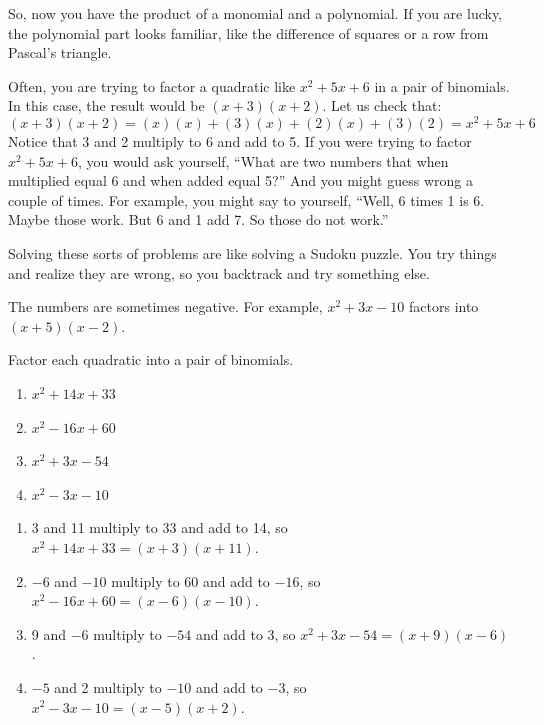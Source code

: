 So, now you have the product of a monomial and a polynomial. If you
are lucky, the polynomial part looks familiar, like the difference of
squares or a row from Pascal's triangle.

Often, you are trying to factor a quadratic like $x^2 + 5x + 6$ in a pair
of binomials. In this case, the result would be $(x + 3)(x + 2)$. Let us check that:
\begin{equation*}
  (x + 3)(x + 2) = (x)(x) + (3)(x) + (2)(x) + (3)(2) = x^2 + 5x + 6
\end{equation*}
Notice that 3 and 2 multiply to 6 and add to 5. If you were trying to
factor $x^2 + 5x + 6$, you would ask yourself, ``What are two numbers that
when multiplied equal 6 and when added equal 5?'' And you might
guess wrong a couple of times. For example, you might say to yourself,
``Well, 6 times 1 is 6. Maybe those work. But 6 and 1 add 7. So those
do not work.''

Solving these sorts of problems are like solving a Sudoku puzzle. You
try things and realize they are wrong, so you backtrack and try
something else.

The numbers are sometimes negative. For example, $x^2 + 3x - 10$ factors into $(x + 5)(x - 2)$.

\begin{Exercise}[title={Factoring quadratics}, label=factorquadratics]
Factor each quadratic into a pair of binomials.
\begin{enumerate}
\item $x^2 + 14x + 33$
\item $x^2 - 16x + 60$
\item $x^2 + 3x - 54$
\item $x^2 - 3x - 10$
\end{enumerate}
\end{Exercise}
\begin{Answer}[ref=factorquadratics]
\begin{enumerate}
\item 3 and 11 multiply to 33 and add to 14, so
  $x^2 + 14x + 33 = (x + 3)(x + 11)$.
\item $-6$ and $-10$ multiply to 60 and add to $-16$, so
  $x^2 - 16x + 60 = (x - 6)(x - 10)$.
\item 9 and $-6$ multiply to $-54$ and add to 3, so
  $x^2 + 3x - 54 = (x + 9)(x - 6)$.
\item $-5$ and 2 multiply to $-10$ and add to $-3$, so
  $x^2 - 3x - 10 = (x - 5)(x + 2)$.
\end{enumerate}
\end{Answer}

